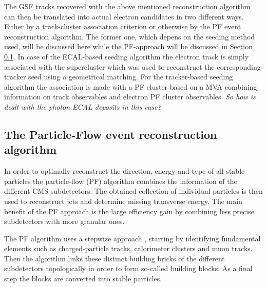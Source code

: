 The GSF tracks recovered with the above mentioned reconstruction algorithm can then be translated into actual electron candidates in two different ways. Either by a track-cluster association criterion or otherwise by the PF event reconstruction algorithm. The former one, which depens on the seeding method used, will be discussed here while the PF-approach will be discussed in Section \ref{subsec::PF}.
In case of the ECAL-based seeding algorithm the electron track is simply associated with the supercluster which was used to reconstruct the corresponding tracker seed using a geometrical matching. For the tracker-based seeding algorithm the association is made with a PF cluster based on a MVA combining information on track observables and electron PF cluster observables. \textit{So how is dealt with the photon ECAL deposits in this case?} 

\subsection{The Particle-Flow event reconstruction algorithm} \label{subsec::PF}

In order to optimally reconstruct the direction, energy and type of all stable particles the particle-flow (PF) algorithm combines the information of the different CMS subdetectors. The obtained collection of individual particles is then used to reconstruct jets and determine missing transverse energy.
The main benefit of the PF approach is the large efficiency gain by combining less precise subdetectors with more granular ones.

The PF algorithm uses a stepwize approach \cite{}, starting by identifying fundamental elements such as charged-particle tracks, calorimeter clusters and muon tracks. Then the algorithm links these distinct building bricks of the different subdetectors topologically in order to form so-called building blocks. As a final step the blocks are converted into stable particles.

